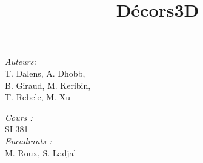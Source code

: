 \documentclass[compress]{beamer} %
\begin{document}
 \title{Décors3D}
 \begin{frame}
\titlepage
    \centering
    \begin{minipage}{0.4\textwidth}
    \begin{flushleft} \large
    \emph{Auteurs:}\\
    T. Dalens, A. Dhobb,\\
    B. Giraud, M. Keribin,\\
    T. Rebele, M. Xu\\
    \end{flushleft}
    \end{minipage}
    \begin{minipage}{0.4\textwidth}
    \begin{flushright} \large
    \emph{Cours :}\\
    SI 381\\
    \emph{Encadrants :}\\
    M. Roux,
    S. Ladjal
    \end{flushright}
    \end{minipage}\\[3cm]
 \end{frame}
 

 
 

 
 
 
 
  
 
 
\end{document}
